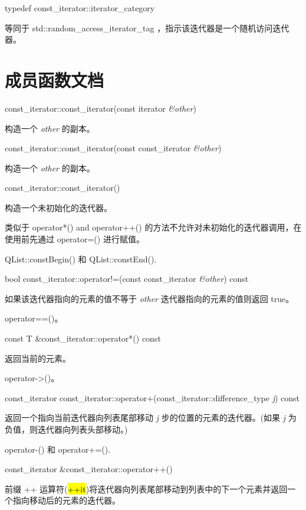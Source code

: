 typedef const\_iterator::iterator\_category

等同于 std::random\_access\_iterator\_tag ，指示该迭代器是一个随机访问迭代器。

\section{成员函数文档}


const\_iterator::const\_iterator(const iterator \emph{\&other})

构造一个 \emph{other} 的副本。

const\_iterator::const\_iterator(const const\_iterator \emph{\&other})

构造一个 \emph{other} 的副本。

const\_iterator::const\_iterator()

构造一个未初始化的迭代器。

类似于 operator*() and operator++() 的方法不允许对未初始化的迭代器调用，在使用前先通过 operator=() 进行赋值。

\begin{seeAlso}
QList::constBegin() 和 QList::constEnd().
\end{seeAlso}


bool const\_iterator::operator!=(const const\_iterator  \emph{\&other}) const

如果该迭代器指向的元素的值不等于 \emph{other} 迭代器指向的元素的值则返回 true。


\begin{seeAlso}
operator==()。
\end{seeAlso}


const T \&const\_iterator::operator*() const

返回当前的元素。

\begin{seeAlso}
operator->()。
\end{seeAlso}


const\_iterator const\_iterator::operator+(const\_iterator::difference\_type \emph{j}) const

返回一个指向当前迭代器向列表尾部移动 \emph{j} 步的位置的元素的迭代器。(如果 \emph{j} 为负值，则迭代器向列表头部移动。)


\begin{seeAlso}
operator-() 和 operator+=().
\end{seeAlso}


const\_iterator \&const\_iterator::operator++()

前缀 ++ 运算符(\hl{++it})将迭代器向列表尾部移动到列表中的下一个元素并返回一个指向移动后的元素的迭代器。

